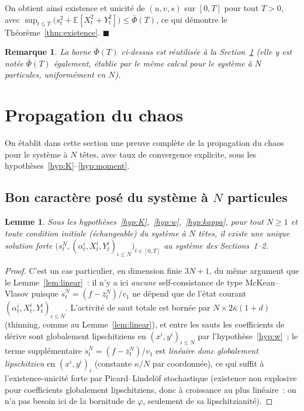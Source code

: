 \documentclass[11pt,a4paper]{article}
\newcommand{\E}{\mathbb{E}}
\theoremstyle{plain}
\newtheorem*{remark*}{Remarque}
\newtheorem{lem}[thm]{Lemme}
\theoremstyle{definition}
\begin{document}
On obtient ainsi existence et unicit\'e de $(u,v,s)$ sur $[0,T]$ pour tout $T>0$, avec $\sup_{t\le T}\big(s_t^2+\E[X_t^2+Y_t^2]\big)\le\bar\Phi(T)$, ce qui d\'emontre le Th\'eor\`eme~\ref{thm:existence}. \hfill$\blacksquare$

\begin{remark*}
La borne $\bar\Phi(T)$ ci-dessus est r\'eutilis\'ee \`a la Section~\ref{sec:pdc} (elle y est not\'ee $\bar\Phi(T)$ \'egalement, \'etablie par le m\^eme calcul pour le syst\`eme \`a $N$ particules, uniform\'ement en $N$).
\end{remark*}

\section{Propagation du chaos}
\label{sec:pdc}

On \'etablit dans cette section une preuve compl\`ete de la propagation du chaos pour le syst\`eme \`a $N$ t\^etes, avec taux de convergence explicite, sous les hypoth\`eses~\ref{hyp:K}--\ref{hyp:moment}.

\subsection{Bon caract\`ere pos\'e du syst\`eme \`a $N$ particules}

\begin{lem}
\label{lem:Nwellposed}
Sous les hypoth\`eses~\ref{hyp:K},~\ref{hyp:w},~\ref{hyp:kappa}, pour tout $N\ge1$ et toute condition initiale (\'echangeable) du syst\`eme \`a $N$ t\^etes, il existe une unique solution forte $\big(s_t^N,(\alpha_t^i,X_t^i,Y_t^i)_{i\le N}\big)_{t\in[0,T]}$ au syst\`eme des Sections~1--2.
\end{lem}
\begin{proof}
C'est un cas particulier, en dimension finie $3N+1$, du m\^eme argument que le Lemme~\ref{lem:linear}~: il n'y a ici \emph{aucune} self-consistance de type McKean--Vlasov puisque $\dot s_t^N=(f-\bar z_t^N)/v_1$ ne d\'epend que de l'\'etat courant $(\alpha_t^i,X_t^i,Y_t^i)_{i\le N}$. L'activit\'e de saut totale est born\'ee par $N\times2\bar\kappa(1+d)$ (thinning, comme au Lemme~\ref{lem:linear}), et entre les sauts les coefficients de d\'erive sont globalement lipschitziens en $(x^i,y^i)_{i\le N}$ par l'hypoth\`ese~\ref{hyp:w}~; le terme suppl\'ementaire $\dot s_t^N=(f-\bar z_t^N)/v_1$ est \emph{lin\'eaire donc globalement lipschitzien} en $(x^i,y^i)_i$ (constante $\kappa/N$ par coordonn\'ee), ce qui suffit \`a l'existence-unicit\'e forte par Picard--Lindel\"of stochastique (existence non explosive pour coefficients globalement lipschitziens, donc \`a croissance au plus lin\'eaire~: on n'a pas besoin ici de la bornitude de $\varphi$, seulement de sa lipschitzianit\'e).
\end{proof}
\end{document}
